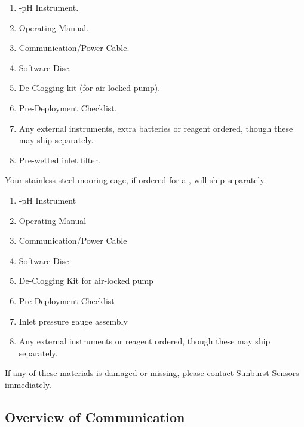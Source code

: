 \or			%
    \begin{enumerate}
    \item \instType{}-pH Instrument.
    \item \instType{} Operating Manual.
    \item Communication/Power Cable.
    \item \instType{} Software Disc.
    \item De-Clogging kit (for air-locked pump).
    \item Pre-Deployment Checklist.
    \item Any external instruments, extra batteries or reagent ordered, though these may ship separately.
    \item Pre-wetted inlet filter.
    \end{enumerate}
    
    \noindent
    Your stainless steel mooring cage, if ordered for a \instType{}, will ship separately.

\or			%

    \begin{enumerate}
    \item \instType{}-pH Instrument
    \item \instType{} Operating Manual
    \item Communication/Power Cable
    \item \instType{} Software Disc
    \item De-Clogging Kit for air-locked pump
    \item Pre-Deployment Checklist
    \item Inlet pressure gauge assembly
    \item Any external instruments or reagent ordered, though these may ship separately.
    \end{enumerate}
\fi			%

\noindent
If any of these materials is damaged or missing, please contact Sunburst Sensors immediately.

\clearpage


\subsection{Overview of Communication}


